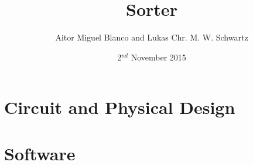 \documentclass[12pt,a4paper]{article}
\begin{document}
\title{Sorter}
\date{2$^{nd}$ November 2015}
\author{Aitor Miguel Blanco and Lukas Chr. M. W. Schwartz}
\maketitle

\pagebreak

\tableofcontents

\pagebreak




\section{Circuit and Physical Design}






\section{Software}




\end{document}
